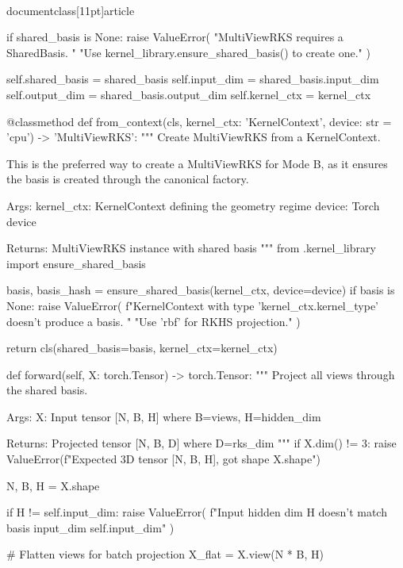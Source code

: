 \\documentclass[11pt]{article}
\begin{document}
\begin{CodeBlock}
        if shared_basis is None:
            raise ValueError(
                "MultiViewRKS requires a SharedBasis. "
                "Use kernel_library.ensure_shared_basis() to create one."
            )
        
        self.shared_basis = shared_basis
        self.input_dim = shared_basis.input_dim
        self.output_dim = shared_basis.output_dim
        self.kernel_ctx = kernel_ctx
    
    @classmethod
    def from_context(cls, kernel_ctx: 'KernelContext', device: str = 'cpu') -> 'MultiViewRKS':
        """
        Create MultiViewRKS from a KernelContext.
        
        This is the preferred way to create a MultiViewRKS for Mode B,
        as it ensures the basis is created through the canonical factory.
        
        Args:
            kernel_ctx: KernelContext defining the geometry regime
            device: Torch device
            
        Returns:
            MultiViewRKS instance with shared basis
        """
        from .kernel_library import ensure_shared_basis
        
        basis, basis_hash = ensure_shared_basis(kernel_ctx, device=device)
        if basis is None:
            raise ValueError(
                f"KernelContext with type '{kernel_ctx.kernel_type}' doesn't produce a basis. "
                "Use 'rbf' for RKHS projection."
            )
        
        return cls(shared_basis=basis, kernel_ctx=kernel_ctx)
    
    def forward(self, X: torch.Tensor) -> torch.Tensor:
        """
        Project all views through the shared basis.
        
        Args:
            X: Input tensor [N, B, H] where B=views, H=hidden_dim
            
        Returns:
            Projected tensor [N, B, D] where D=rks_dim
        """
        if X.dim() != 3:
            raise ValueError(f"Expected 3D tensor [N, B, H], got shape {X.shape}")
        
        N, B, H = X.shape
        
        if H != self.input_dim:
            raise ValueError(
                f"Input hidden dim {H} doesn't match basis input_dim {self.input_dim}"
            )
        
        # Flatten views for batch projection
        X_flat = X.view(N * B, H)
        

\end{CodeBlock}
\end{document}
